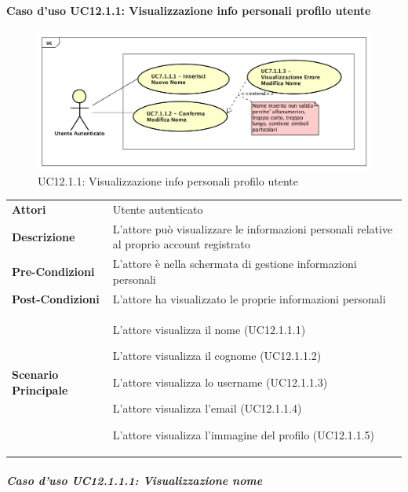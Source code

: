\paragraph{Caso d'uso UC12.1.1: Visualizzazione info personali profilo utente}
\label{UC12_1_1}
\begin{figure}[ht]
	\centering
	\includegraphics[scale=0.45]{UML/UC12_1_1.png}
	\caption{UC12.1.1: Visualizzazione info personali profilo utente}
\end{figure}
\FloatBarrier
\begin{tabular}{ l | p{11cm}}
	\hline
	\rowcolor{Gray}
	\multicolumn{2}{c}{UC12.1.1 - Visualizzazione info personali profilo utente} \\
	\hline
	\textbf{Attori} & Utente autenticato \\
	\textbf{Descrizione} & L'attore può visualizzare le informazioni personali relative al proprio account registrato\\
	\textbf{Pre-Condizioni} & L'attore è nella schermata di gestione informazioni personali\\
	\textbf{Post-Condizioni} & L'attore ha visualizzato le proprie informazioni personali \\
	\textbf{Scenario Principale} & 
	\begin{enumerate*}[label=(\arabic*.),itemjoin={\newline}]
		\item L'attore visualizza il nome (UC12.1.1.1)
		\item L'attore visualizza il cognome (UC12.1.1.2)
		\item L'attore visualizza lo username (UC12.1.1.3)
		\item L'attore visualizza l'email (UC12.1.1.4)
		\item L'attore visualizza l'immagine del profilo (UC12.1.1.5)
	\end{enumerate*}
\end{tabular}

\subparagraph{Caso d'uso UC12.1.1.1: Visualizzazione nome}
\label{UC12_1_1_1}

